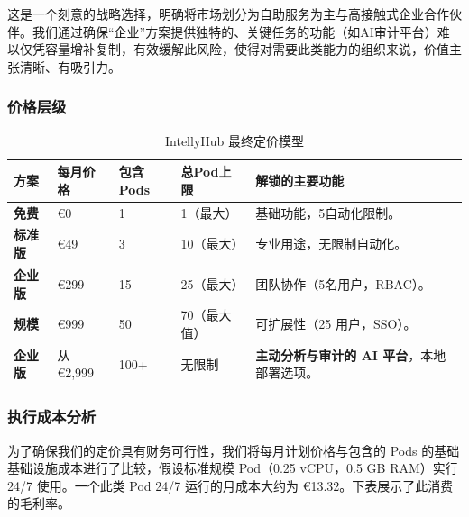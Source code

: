 \documentclass[11点, A4纸, 单面]{article}
\begin{document}
这是一个刻意的战略选择，明确将市场划分为自助服务为主与高接触式企业合作伙伴。我们通过确保“企业”方案提供独特的、关键任务的功能（如AI审计平台）难以仅凭容量增补复制，有效缓解此风险，使得对需要此类能力的组织来说，价值主张清晰、有吸引力。

\subsubsection{价格层级}

\begin{table}[H]
\centering
\caption{IntellyHub 最终定价模型}
\label{tab:final_pricing_model}
\begin{tabularx}{\textwidth}{l L L L L} 
\toprule
\textbf{方案} & \textbf{每月价格} & \textbf{包含Pods} & \textbf{总Pod上限} & \textbf{解锁的主要功能} \\
\midrule
\textbf{免费} & \euro{0} & 1 & 1（最大） & 基础功能，5自动化限制。 \\
\addlinespace
\textbf{标准版} & \euro{49} & 3 & 10（最大） & 专业用途，无限制自动化。 \\
\addlinespace
\textbf{企业版} & \euro{299} & 15 & 25（最大） & 团队协作（5名用户，RBAC）。 \\
\addlinespace



\textbf{规模} & \euro{999} & 50 & 70（最大值） & 可扩展性（25 用户，SSO）。\\
\addlinespace
\textbf{企业版} & 从 \euro{2,999} & 100+ & 无限制 & \textbf{主动分析与审计的 AI 平台}，本地部署选项。\\
\bottomrule
\end{tabularx}
\end{table}

\subsubsection{执行成本分析}

为了确保我们的定价具有财务可行性，我们将每月计划价格与包含的 Pods 的基础基础设施成本进行了比较，假设标准规模 Pod（0.25 vCPU，0.5 GB RAM）实行 24/7 使用。一个此类 Pod 24/7 运行的月成本大约为 \euro{13.32}。下表展示了此消费的毛利率。
\end{document}
